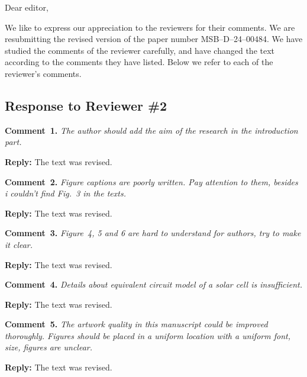 \documentclass[a4paper,fleqn]{cas-sc}
\begin{document}
\shorttitle{}


Dear editor,

We like to express our appreciation to the reviewers for their comments.
We are resubmitting the revised version of the paper number MSB--D--24--00484.
We have studied the comments of the reviewer carefully, and have changed the text according to the comments they
have listed.
Below we refer to each of the reviewer’s comments.


\subsection*{Response to Reviewer \#2 }

\noindent
\textcolor[rgb]{0.00,0.50,1.00}{\textbf{Comment~1.}}
\emph{The author should add the aim of the research in the introduction part.}

\noindent
\textcolor[rgb]{0.51,0.00,0.00}{\textbf{Reply:}}
The text was revised.

\vspace{1cm}
\noindent
\textcolor[rgb]{0.00,0.50,1.00}{\textbf{Comment~2.}}
\emph{Figure captions are poorly written. Pay attention to them, besides i couldn't find Fig.~3 in the texts.}

\noindent
\textcolor[rgb]{0.51,0.00,0.00}{\textbf{Reply:}}
The text was revised.

\vspace{1cm}
\noindent
\textcolor[rgb]{0.00,0.50,1.00}{\textbf{Comment~3.}}
\emph{Figure~4, 5 and 6 are hard to understand for authors, try to make it clear.}

\noindent
\textcolor[rgb]{0.51,0.00,0.00}{\textbf{Reply:}}
The text was revised.

\vspace{1cm}
\noindent
\textcolor[rgb]{0.00,0.50,1.00}{\textbf{Comment~4.}}
\emph{Details about equivalent circuit model of a solar cell is insufficient.}

\noindent
\textcolor[rgb]{0.51,0.00,0.00}{\textbf{Reply:}}
The text was revised.

\vspace{1cm}
\noindent
\textcolor[rgb]{0.00,0.50,1.00}{\textbf{Comment~5.}}
\emph{The artwork quality in this manuscript could be improved thoroughly.
Figures should be placed in a uniform location with a uniform font, size, figures are unclear.}

\noindent
\textcolor[rgb]{0.51,0.00,0.00}{\textbf{Reply:}}
The text was revised.
\end{document}
